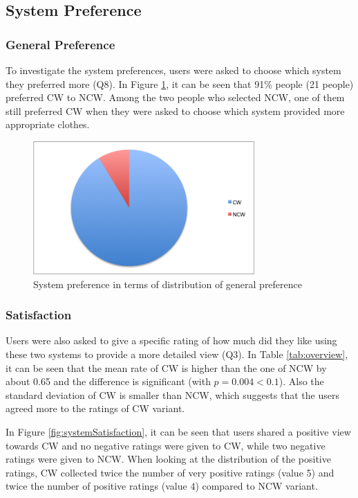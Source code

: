 \subsection{System Preference} \label{sec:results_sp}

\subsubsection{General Preference} \label{sec:results_sp_gp}

To investigate the system preferences, users were asked to choose which system they preferred more (Q8). In Figure \ref{fig:generalPreference}, it can be seen that 91\% people (21 people) preferred CW to NCW. Among the two people who selected NCW, one of them still preferred CW when they were asked to choose which system provided more appropriate clothes.

\begin{figure}[H]
	\centering
	\includegraphics[height=2in]{figures/generalPreference.png}
	\caption{System preference in terms of distribution of general preference}
	\label{fig:generalPreference}
\end{figure}


\subsubsection{Satisfaction} \label{sec:results_sp_s}

Users were also asked to give a specific rating of how much did they like using these two systems to provide a more detailed view (Q3). In Table \ref{tab:overview}, it can be seen that the mean rate of CW is higher than the one of NCW by about 0.65 and the difference is significant (with $p = 0.004 < 0.1$). Also the standard deviation of CW is smaller than NCW, which suggests that the users agreed more to the ratings of CW variant.

In Figure \ref{fig:systemSatisfaction}, it can be seen that users shared a positive view towards CW and no negative ratings were given to CW, while two negative ratings were given to NCW. When looking at the distribution of the positive ratings, CW collected twice the number of very positive ratings (value 5) and twice the number of positive ratings (value 4) compared to NCW variant. 

